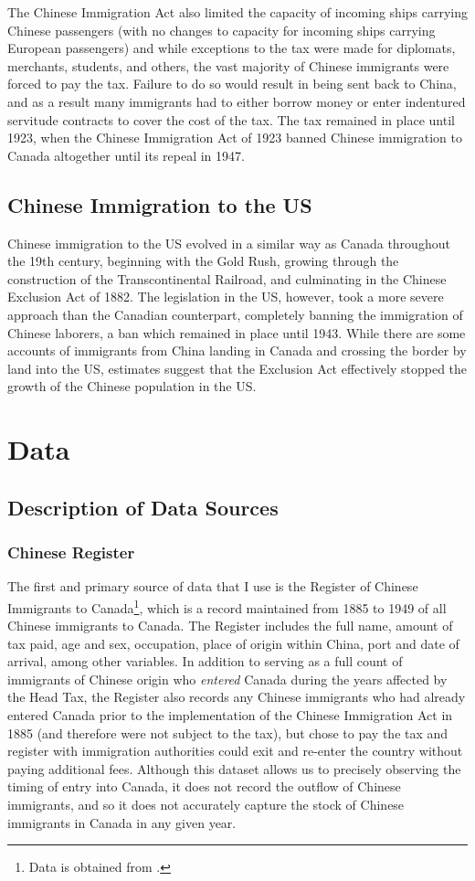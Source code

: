 \documentclass[12pt]{article}
\begin{document}
The Chinese Immigration Act also limited the capacity of incoming ships carrying Chinese passengers (with no changes to capacity for incoming ships carrying European passengers) and while exceptions to the tax were made for diplomats, merchants, students, and others, the vast majority of Chinese immigrants were forced to pay the tax. 
Failure to do so would result in being sent back to China, and as a result many immigrants had to either borrow money or enter indentured servitude contracts to cover the cost of the tax. 
The tax remained in place until 1923, when the Chinese Immigration Act of 1923 banned Chinese immigration to Canada altogether until its repeal in 1947.

\subsection{Chinese Immigration to the US}
Chinese immigration to the US evolved in a similar way as Canada throughout the 19th century, beginning with the Gold Rush, growing through the construction of the Transcontinental Railroad, and culminating in the Chinese Exclusion Act of 1882.
The legislation in the US, however, took a more severe approach than the Canadian counterpart, completely banning the immigration of Chinese laborers, a ban which remained in place until 1943. 
While there are some accounts of immigrants from China landing in Canada and crossing the border by land into the US, estimates suggest that the Exclusion Act effectively stopped the growth of the Chinese population in the US.

\section{Data}
\subsection{Description of Data Sources}

\subsubsection{Chinese Register}
The first and primary source of data that I use is the Register of Chinese Immigrants to Canada\footnote{Data is obtained from \citet{chineseregister}.}, 
which is a record maintained from 1885 to 1949 of all Chinese immigrants to Canada.
The Register includes the full name, amount of tax paid, age and sex, occupation, place of origin within China, port and date of arrival, among other variables. 
In addition to serving as a full count of immigrants of Chinese origin who \textit{entered} Canada during the years affected by the Head Tax,
the Register also records any Chinese immigrants who had already entered Canada prior to the implementation of the Chinese Immigration Act in 1885 (and therefore were not subject to the tax),
but chose to pay the tax and register with immigration authorities could exit and re-enter the country without paying additional fees.
Although this dataset allows us to precisely observing the timing of entry into Canada, it does not record the outflow of Chinese immigrants, and so it does not accurately capture the stock of Chinese immigrants in Canada in any given year.
\end{document}
